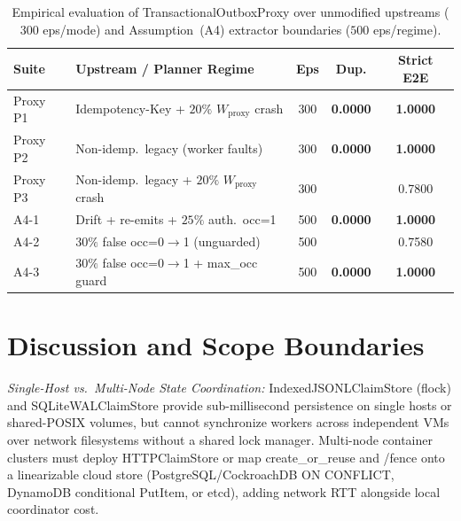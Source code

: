 \documentclass[10pt,journal]{IEEEtran}
\def\texttt#1{#1}%
\theoremstyle{definition}
\theoremstyle{remark}
\begin{document}
\begin{table}[!t]
\centering
\caption{Empirical evaluation of \texttt{TransactionalOutboxProxy} over unmodified upstreams ($300$ eps/mode) and Assumption~(A4) extractor boundaries ($500$ eps/regime).}
\label{tab:proxy_a4}
\footnotesize
\setlength{\tabcolsep}{3.5pt}
\renewcommand{\arraystretch}{1.12}
\begin{tabular}{@{}lp{3.45cm}ccc@{}}
\toprule
\textbf{Suite} & \textbf{Upstream / Planner Regime} & \textbf{Eps} & \textbf{Dup.} & \textbf{Strict E2E} \\
\midrule
Proxy P1 & \texttt{Idempotency-Key} + $20\%$ $W_{\mathrm{proxy}}$ crash & 300 & \textbf{0.0000} & \textbf{1.0000} \\
Proxy P2 & Non-idemp.\ legacy (worker faults) & 300 & \textbf{0.0000} & \textbf{1.0000} \\
Proxy P3 & Non-idemp.\ legacy + $20\%$ $W_{\mathrm{proxy}}$ crash & 300 & \ProxyLegacyCrashDup{} & 0.7800 \\
\midrule
A4-1 & Drift + re-emits + $25\%$ auth.\ \texttt{occ=1} & 500 & \textbf{0.0000} & \textbf{1.0000} \\
A4-2 & $30\%$ false \texttt{occ=0$\to$1} (unguarded) & 500 & \AFourUnguardedDup{} & 0.7580 \\
A4-3 & $30\%$ false \texttt{occ=0$\to$1} + \texttt{max\_occ} guard & 500 & \textbf{0.0000} & \textbf{1.0000} \\
\bottomrule
\end{tabular}
\end{table}

\section{Discussion and Scope Boundaries}\label{sec:discussion}

\emph{Single-Host vs.\ Multi-Node State Coordination:} \texttt{IndexedJSONLClaimStore} (\texttt{flock}) and \texttt{SQLiteWALClaimStore} provide sub-millisecond persistence on single hosts or shared-POSIX volumes, but cannot synchronize workers across independent VMs over network filesystems without a shared lock manager. Multi-node container clusters must deploy \texttt{HTTPClaimStore} or map \texttt{create\_or\_reuse} and \texttt{/fence} onto a linearizable cloud store (PostgreSQL/CockroachDB \texttt{ON CONFLICT}, DynamoDB conditional \texttt{PutItem}, or \texttt{etcd}), adding network RTT alongside \LatNetStepPFifty{} local coordinator cost.
\end{document}
